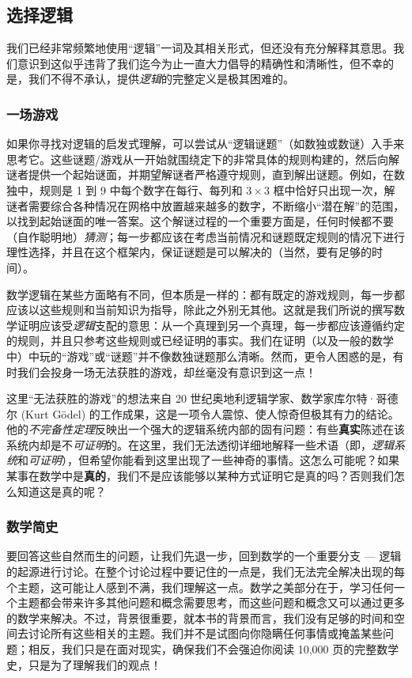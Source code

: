 \subsection{选择逻辑}

我们已经非常频繁地使用``逻辑''一词及其相关形式，但还没有充分解释其意思。我们意识到这似乎违背了我们迄今为止一直大力倡导的精确性和清晰性，但不幸的是，我们不得不承认，提供\emph{逻辑}的完整定义是极其困难的。

\subsubsection*{一场游戏}

如果你寻找对逻辑的启发式理解，可以尝试从``逻辑谜题''（如数独或数谜）入手来思考它。这些谜题/游戏从一开始就围绕定下的非常具体的规则构建的，然后向解谜者提供一个起始谜面，并期望解谜者严格遵守规则，直到解出谜题。例如，在数独中，规则是 1 到 9 中每个数字在每行、每列和 $3 \times 3$ 框中恰好只出现一次，解谜者需要综合各种情况在网格中放置越来越多的数字，不断缩小``潜在解''的范围，以找到起始谜面的唯一答案。这个解谜过程的一个重要方面是，任何时候都不要（自作聪明地）\emph{猜测}；每一步都应该在考虑当前情况和谜题既定规则的情况下进行理性选择，并且在这个框架内，保证谜题是可以解决的（当然，要有足够的时间）。

数学逻辑在某些方面略有不同，但本质是一样的：都有既定的游戏规则，每一步都应该以这些规则和当前知识为指导，除此之外别无其他。这就是我们所说的撰写数学证明应该受\emph{逻辑}支配的意思：从一个真理到另一个真理，每一步都应该遵循约定的规则，并且只参考这些规则或已经证明的事实。我们在证明（以及一般的数学中）中玩的``游戏''或``谜题''并不像数独谜题那么清晰。然而，更令人困惑的是，有时我们会投身一场无法获胜的游戏，却丝毫没有意识到这一点！

这里``无法获胜的游戏''的想法来自 20 世纪奥地利逻辑学家、数学家库尔特·哥德尔 (Kurt Gödel) 的工作成果，这是一项令人震惊、使人惊奇但极其有力的结论。他的\emph{不完备性定理}反映出一个强大的逻辑系统内部的固有问题：有些\textbf{真实}陈述在该系统内却是不\emph{可证明}的。在这里，我们无法透彻详细地解释一些术语（即，\emph{逻辑系统}和\emph{可证明}），但希望你能看到这里出现了一些神奇的事情。这怎么可能呢？如果某事在数学中是\textbf{真的}，我们不是应该能够以某种方式证明它是真的吗？否则我们怎么知道这是真的呢？

\subsubsection*{数学简史}

要回答这些自然而生的问题，让我们先退一步，回到数学的一个重要分支 --- 逻辑的起源进行讨论。在整个讨论过程中要记住的一点是，我们无法完全解决出现的每个主题，这可能让人感到不满，我们理解这一点。数学之美部分在于，学习任何一个主题都会带来许多其他问题和概念需要思考，而这些问题和概念又可以通过更多的数学来解决。不过，背景很重要，就本书的背景而言，我们没有足够的时间和空间去讨论所有这些相关的主题。我们并不是试图向你隐瞒任何事情或掩盖某些问题；相反，我们只是在面对现实，确保我们不会强迫你阅读 10,000 页的完整数学史，只是为了理解我们的观点！

